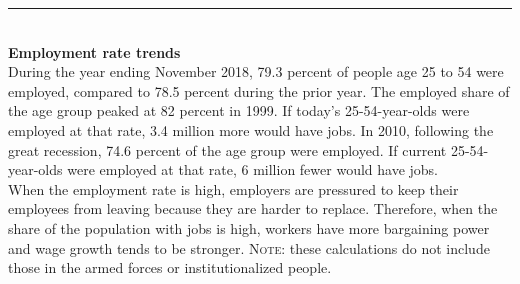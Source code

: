 \documentclass{report}
\newcommand{\dateaxisticks}{
		axis line style={draw=none},
		max space between ticks=38,	 
		xmin={1997-01-01},
		xtick={
			{1995-01-01},
			{2000-01-01},
			{2005-01-01},
			{2010-01-01},
			{2015-01-01}},
	    minor xtick={
	    	{1994-01-01}, {1996-01-01}, {1997-01-01}, {1998-01-01}, {1999-01-01},
			{2001-01-01}, {2002-01-01}, {2003-01-01}, {2004-01-01}, 
	    	{2006-01-01}, {2007-01-01}, {2008-01-01}, {2009-01-01},
	      	{2011-01-01}, {2012-01-01}, {2013-01-01}, {2014-01-01},
	      	{2016-01-01}, {2017-01-01}, {2018-01-01}, {2019-01-01}},
	    enlarge y limits={0.08},
	    enlarge x limits={0.12},}
\newcommand{\lastpt}[1]{node[circle, 
		minimum size=3pt, inner sep=0pt, draw, fill, pos=1](#1){};}
\begin{document}
\noindent \begin{minipage}[t]{0.48\textwidth}

\noindent \textcolor{blue}{\rule[-6pt]{90mm}{24pt}}
		\vspace{-6mm}
		
		\hspace{1mm} \textcolor{white}{}
\vspace{1.1mm}

\hspace{0.8mm} 
\vspace{4mm}\\
\textbf{Employment rate trends}
\vspace{2mm}\\
During the year ending November 2018, 79.3 percent of people age 25 to 54 were employed, compared to 78.5 percent during the prior year. The employed share of the age group peaked at 82 percent in 1999. If today's 25-54-year-olds were employed at that rate, 3.4 million more would have jobs. In 2010, following the great recession, 74.6 percent of the age group were employed. If current 25-54-year-olds were employed at that rate, 6 million fewer would have jobs.\\

When the employment rate is high, employers are pressured to keep their employees from leaving because they are harder to replace. Therefore, when the share of the population with jobs is high, workers have more bargaining power and wage growth tends to be stronger. \textsc{Note:} these calculations do not include those in the armed forces or institutionalized people.\\
\end{minipage}\hfill
\end{document}
